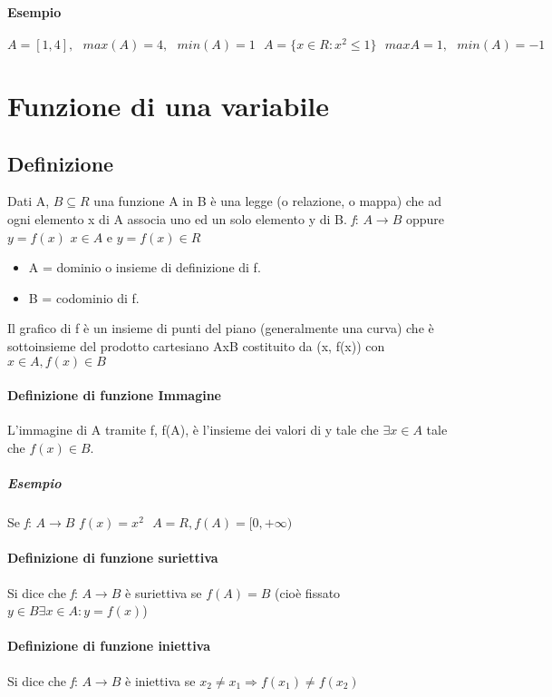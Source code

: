 \paragraph{Esempio} $A=[1,4],\text{ } max(A)=4,\text{ } min(A)=1 \text{ }
A=\{x\in R:x^2\leq 1\} \text{ } max{A}=1, \text{ } min(A)=-1$
\clearpage

\section{Funzione di una variabile}
\subsection{Definizione}
Dati A, $B\subseteq R$ una funzione A in B è una legge (o relazione, o mappa)
che ad ogni elemento x di A associa uno ed un solo elemento y di B.
\textit{f}: $A\to B$ oppure $y=f(x)$ $x\in A$ e $y=f(x)\in R$
\begin{itemize}
	\item A = dominio o insieme di definizione di f.
	\item B = codominio di f.
\end{itemize}
\begin{figure}[!ht]
	\begin{tikzpicture}

	\end{tikzpicture}

\end{figure}
Il grafico di f è un insieme di punti del piano (generalmente una curva) che è
sottoinsieme del prodotto cartesiano AxB costituito da (x, f(x)) con $x\in A,
f(x)\in B$
\paragraph{Definizione di funzione Immagine}
L'immagine di A tramite f, f(A), è l'insieme dei valori di y tale che $\exists
x \in A$ tale che $f(x) \in B$.
\subparagraph{Esempio} Se \textit{f}: $A\to B$ $f(x)=x^2 \text{ } A=R,
f(A)=[0,+\infty)$\\
\paragraph{Definizione di funzione suriettiva} Si dice che \textit{f}: $A\to B$
è suriettiva se $f(A)=B$ (cioè fissato $y\in B \exists x\in A: y=f(x)$)
\paragraph{Definizione di funzione iniettiva}
Si dice che \textit{f}: $A\to B$ è iniettiva se $x_2\neq x_1\Rightarrow f(x_1)
\neq f(x_2)$
